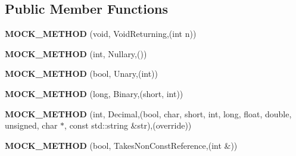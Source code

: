 \subsection*{Public Member Functions}
\begin{DoxyCompactItemize}
\item 
\mbox{\label{classtesting_1_1gmock__function__mocker__test_1_1MockFoo_aa51bd02d682a33eeafaa297c1967455b}} 
{\bfseries M\+O\+C\+K\+\_\+\+M\+E\+T\+H\+OD} (void, Void\+Returning,(int n))
\item 
\mbox{\label{classtesting_1_1gmock__function__mocker__test_1_1MockFoo_aeed9392b4906326c2e5ec651ea9155ca}} 
{\bfseries M\+O\+C\+K\+\_\+\+M\+E\+T\+H\+OD} (int, Nullary,())
\item 
\mbox{\label{classtesting_1_1gmock__function__mocker__test_1_1MockFoo_a96c4dd29a859254e057513027a3315c8}} 
{\bfseries M\+O\+C\+K\+\_\+\+M\+E\+T\+H\+OD} (bool, Unary,(int))
\item 
\mbox{\label{classtesting_1_1gmock__function__mocker__test_1_1MockFoo_a9d6597b94797dfeb1061ad7a48bbc141}} 
{\bfseries M\+O\+C\+K\+\_\+\+M\+E\+T\+H\+OD} (long, Binary,(short, int))
\item 
\mbox{\label{classtesting_1_1gmock__function__mocker__test_1_1MockFoo_ab6783427c5fb99f8a9c25fba9210c748}} 
{\bfseries M\+O\+C\+K\+\_\+\+M\+E\+T\+H\+OD} (int, Decimal,(bool, char, short, int, long, float, double, unsigned, char $\ast$, const std\+::string \&str),(override))
\item 
\mbox{\label{classtesting_1_1gmock__function__mocker__test_1_1MockFoo_a50aeadd7e413ca2a8ba4507b21d4b345}} 
{\bfseries M\+O\+C\+K\+\_\+\+M\+E\+T\+H\+OD} (bool, Takes\+Non\+Const\+Reference,(int \&))
\item 
\mbox{\label{classtesting_1_1gmock__function__mocker__test_1_1MockFoo_a8449bdfea3eaf9fabb34fa694c17ab25}} 

\end{DoxyCompactItemize}
